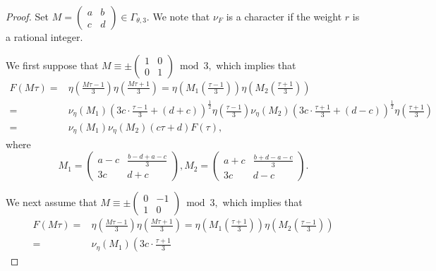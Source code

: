 \documentclass[12pt]{article}
\theoremstyle{definition}
\numberwithin{equation}{section}
\numberwithin{theorem}{section}
\begin{document}
\begin{proof}
Set 
$
M=
\begin{pmatrix}
a & b \\
c & d
\end{pmatrix}
\in 
\Gamma_{\theta,3}. 
$ 
We note that $\nu_{F}$ is a character if the weight $r$ is a rational integer.  
\par
We first suppose that 
$
M
\equiv \pm
\begin{pmatrix}
1 & 0 \\
0 & 1
\end{pmatrix} 
\bmod{3},$ 
which implies that  
\begin{align*}
F(M\tau)=&
\eta \left(\frac{ M \tau-1}{3} \right) \eta\left(\frac{ M\tau+1}{3} \right)
=
\eta \left( M_1 \left( \frac{  \tau-1}{3} \right)  \right) \eta\left( M_2  \left( \frac{ \tau+1}{3} \right)  \right) \\
=&
\nu_{\eta}(M_1) 
\left(
3c \cdot 
\frac{\tau-1}{3}
+(d+c)
\right)^{\frac12}
\eta \left(\frac{\tau-1}{3} \right)
\nu_{\eta} (M_2)
\left(
3c \cdot 
\frac{\tau+1}{3}
+(d-c)
\right)^{\frac12}
\eta\left(\frac{\tau+1}{3} \right)  \\
=&
\nu_{\eta}(M_1) \nu_{\eta} (M_2)
(c\tau+d)F(\tau),
\end{align*}
where 
\begin{equation*}
M_1
=
\begin{pmatrix}
a-c & \frac{ b-d+a-c }{3} \\
3c & d+c
\end{pmatrix}, 
M_2
=
\begin{pmatrix}
a+c & \frac{ b+d-a-c }{3} \\
3c & d-c
\end{pmatrix}. 
\end{equation*}
\par
We next assume that 
$
M
\equiv \pm
\begin{pmatrix}
0 & -1 \\
1 & 0
\end{pmatrix} 
\bmod{3},$ 
which implies that  
\begin{align*}
F(M\tau)=&
\eta \left(\frac{ M \tau-1}{3} \right) \eta\left(\frac{ M\tau+1}{3} \right)
=
\eta \left( M_1 \left( \frac{  \tau+1}{3} \right)  \right) \eta\left( M_2  \left( \frac{ \tau-1}{3} \right)  \right) \\
=&
\nu_{\eta}(M_1) 
\left(
3c \cdot 
\frac{\tau+1}{3}

\end{align*}
\end{proof}
\end{document}
